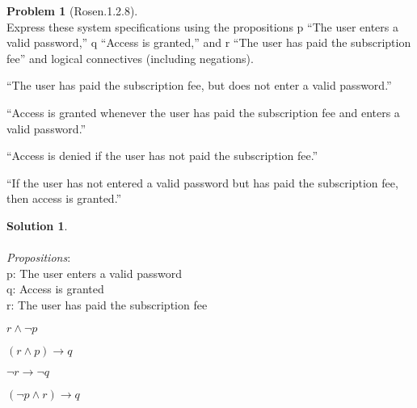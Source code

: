 \documentclass{article}
\theoremstyle{definition}
\newtheorem*{problem}{Problem}
\newtheorem*{solution}{Solution}
\begin{document}
\begin{problem}[Rosen.1.2.8]\ \\
Express these system specifications using the propositions
p “The user enters a valid password,” q “Access is
granted,” and r “The user has paid the subscription fee”
and logical connectives (including negations).
\begin{compactenum}
\renewcommand{\theenumi}{\alph{enumi}}
\item “The user has paid the subscription fee, but does not enter a valid password.”
\item “Access is granted whenever the user has paid the subscription fee and enters a valid password.”
\item “Access is denied if the user has not paid the subscription fee.”
\item “If the user has not entered a valid password but has paid the subscription fee, then access is granted.”
\end{compactenum}
\end{problem}

\begin{solution}\ \\
\ \\
\textit{Propositions}:\ \\
p: The user enters a valid password\ \\
q: Access is granted\ \\
r: The user has paid the subscription fee\ \\
\begin{compactenum}
\renewcommand{\theenumi}{\alph{enumi}}
\item $r \wedge \neg p$
\item $(r \wedge p) \rightarrow q$
\item $\neg r \rightarrow \neg q$
\item $(\neg p \wedge r) \rightarrow q$
\end{compactenum}
\end{solution}
\end{document}
